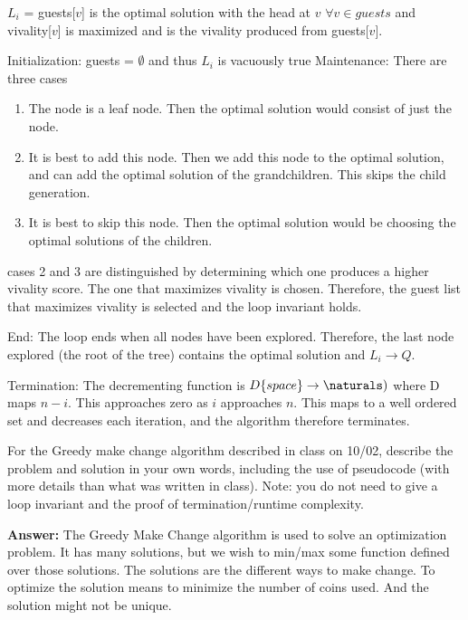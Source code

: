 \documentclass{article}
\begin{document}
 $L_i$ = guests[$v$] is the optimal solution with the head at $v$ $\forall v \in guests$ and vivality[$v$] is maximized and is the vivality produced from guests[$v$].
 
 Initialization: guests = $\emptyset$ and thus $L_i$ is vacuously true
 Maintenance: There are three cases
 \begin{enumerate}[1.]
 \item The node is a leaf node. Then the optimal solution would consist of just the node.
 \item It is best to add this node. Then we add this node to the optimal solution, and can add the optimal solution of the grandchildren. This skips the child generation.
 \item It is best to skip this node. Then the optimal solution would be choosing the optimal solutions of the children.
 \end{enumerate}
 cases 2 and 3 are distinguished by determining which one produces a higher vivality score. The one that maximizes vivality is chosen. Therefore, the guest list that maximizes vivality is selected and the loop invariant holds.
 
 End: The loop ends when all nodes have been explored. Therefore, the last node explored (the root of the tree) contains the optimal solution and $L_i \rightarrow Q$.
 
 Termination: The decrementing function is $D\{space\} \rightarrow \naturals)$ where D maps $n - i$. This approaches zero as $i$ approaches $n$. This maps to a well ordered set and decreases each iteration, and the algorithm therefore terminates.


\nextprob
For the Greedy make change algorithm described in class on 10/02, describe the
problem and solution in your own words, including the use of pseudocode (with
more details than what was written in class).  Note: you do not need to give a
loop invariant and the proof of termination/runtime complexity.

\textbf{Answer:} The Greedy Make Change algorithm is used to solve an optimization problem. It has many solutions, but we wish to min/max some function defined over those solutions. The solutions are the different ways to make change. To optimize the solution means to minimize the number of coins used. And the solution might not be unique.
\end{document}
